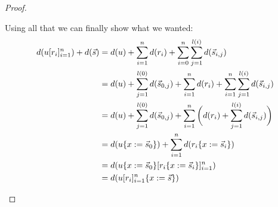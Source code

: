 \begin{proof}
\begin{itemize}
Using all that we can finally show what we wanted:
\begin{equation*}\begin{split}
d(u[r_i]_{i=1}^{n}) + d(\vec{s}) & =
  d(u) + \sum_{i=1}^n d(r_i) + \sum_{i=0}^n \sum_{j=1}^{l(i)} d(\vec{s}_{i,j}) \\
 &= d(u) + \sum_{j=1}^{l(0)} d(\vec{s}_{0,j}) + \sum_{i=1}^n d(r_i) + \sum_{i=1}^n \sum_{j=1}^{l(i)} d(\vec{s}_{i,j}) \\
 &= d(u) + \sum_{j=1}^{l(0)} d(\vec{s}_{0,j}) + \sum_{i=1}^n \bigg(d(r_i) + \sum_{j=1}^{l(i)} d(\vec{s}_{i,j}) \bigg) \\
 &= d(u\{x := \vec{s}_0\}) + \sum_{i=1}^n d(r_i\{x := \vec{s}_i\}) \\
 &= d(u\{x := \vec{s}_0\} [r_i\{x := \vec{s}_i\}]_{i=1}^n) \\
 &= d(u[r_i]_{i=1}^{n}\{x := \vec{s}\}) \\
\end{split}\end{equation*}
\end{itemize}
\end{proof}
